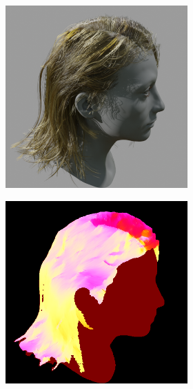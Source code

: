 \documentclass{article}
\begin{document}
\begin{figure}[h]
    \centering
    \begin{subfigure}{0.22\textwidth}
        \centering
        \begin{subfigure}{0.48\textwidth}
            \centering
            \includegraphics[width=\textwidth]{./images/baseline-method/test_6_rendered.png}
        \end{subfigure}
        \hfill
        \begin{subfigure}{0.48\textwidth}
            \centering
            \includegraphics[width=\textwidth]{./images/baseline-method/test_6_hairstep.png}

\end{subfigure}
\end{subfigure}
\end{figure}
\end{document}
